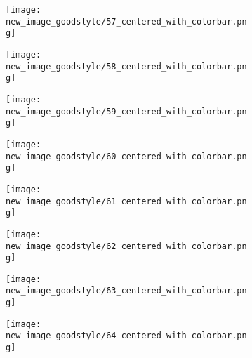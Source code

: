 \documentclass[a4paper,12pt]{article}
\begin{document}
\begin{figure}[H]
  \begin{subfigure}{0.11\textwidth}
    \texttt{[image: new\_image\_goodstyle/57\_centered\_with\_colorbar.png]}
  \end{subfigure}
  \hfill
  \begin{subfigure}{0.11\textwidth}
    \texttt{[image: new\_image\_goodstyle/58\_centered\_with\_colorbar.png]}
  \end{subfigure}
  \hfill
  \begin{subfigure}{0.11\textwidth}
    \texttt{[image: new\_image\_goodstyle/59\_centered\_with\_colorbar.png]}
  \end{subfigure}
  \hfill
  \begin{subfigure}{0.11\textwidth}
    \texttt{[image: new\_image\_goodstyle/60\_centered\_with\_colorbar.png]}
  \end{subfigure}
  \hfill
  \begin{subfigure}{0.11\textwidth}
    \texttt{[image: new\_image\_goodstyle/61\_centered\_with\_colorbar.png]}
  \end{subfigure}
  \hfill
  \begin{subfigure}{0.11\textwidth}
    \texttt{[image: new\_image\_goodstyle/62\_centered\_with\_colorbar.png]}
  \end{subfigure}
  \hfill
  \begin{subfigure}{0.11\textwidth}
    \texttt{[image: new\_image\_goodstyle/63\_centered\_with\_colorbar.png]}
  \end{subfigure}
  \hfill
  \begin{subfigure}{0.11\textwidth}
    \texttt{[image: new\_image\_goodstyle/64\_centered\_with\_colorbar.png]}
  \end{subfigure}
  \hfill
\end{figure}
\end{document}
